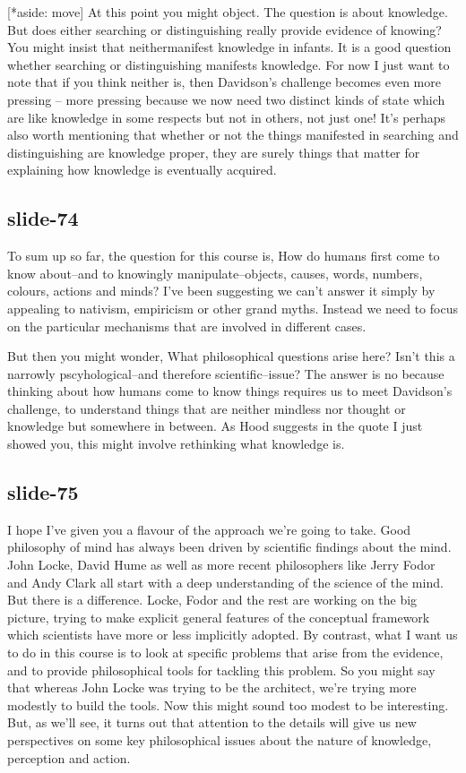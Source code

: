 \documentclass[12pt,\papersize]{extarticle}
\begin{document}
[*aside: move] At this point you might object. The question is about knowledge. But does either searching or distinguishing really provide evidence of knowing? You might insist that neithermanifest knowledge in infants. It is a good question whether searching or distinguishing manifests knowledge. For now I just want to note that if you think neither is, then Davidson's challenge becomes even more pressing -- more pressing because we now need two distinct kinds of state which are like knowledge in some respects but not in others, not just one! It's perhaps also worth mentioning that whether or not the things manifested in searching and distinguishing are knowledge proper, they are surely things that matter for explaining how knowledge is eventually acquired.
 
 
 
\subsection{slide-74}
To sum up so far, the question for this course is, How do humans first come to know about--and to knowingly manipulate--objects, causes, words, numbers, colours, actions and minds? I've been suggesting we can't answer it simply by appealing to nativism, empiricism or other grand myths. Instead we need to focus on the particular mechanisms that are involved in different cases.
 
But then you might wonder, What philosophical questions arise here? Isn't this a narrowly pscyhological--and therefore scientific--issue? The answer is no because thinking about how humans come to know things requires us to meet Davidson's challenge, to understand things that are neither mindless nor thought or knowledge but somewhere in between. As Hood suggests in the quote I just showed you, this might involve rethinking what knowledge is.
 
 
 
\subsection{slide-75}
I hope I've given you a flavour of the approach we're going to take. Good philosophy of mind has always been driven by scientific findings about the mind. John Locke, David Hume as well as more recent philosophers like Jerry Fodor and Andy Clark all start with a deep understanding of the science of the mind. But there is a difference. Locke, Fodor and the rest are working on the big picture, trying to make explicit general features of the conceptual framework which scientists have more or less implicitly adopted. By contrast, what I want us to do in this course is to look at specific problems that arise from the evidence, and to provide philosophical tools for tackling this problem. So you might say that whereas John Locke was trying to be the architect, we're trying more modestly to build the tools. Now this might sound too modest to be interesting. But, as we'll see, it turns out that attention to the details will give us new perspectives on some key philosophical issues about the nature of knowledge, perception and action.
 
\end{document}
